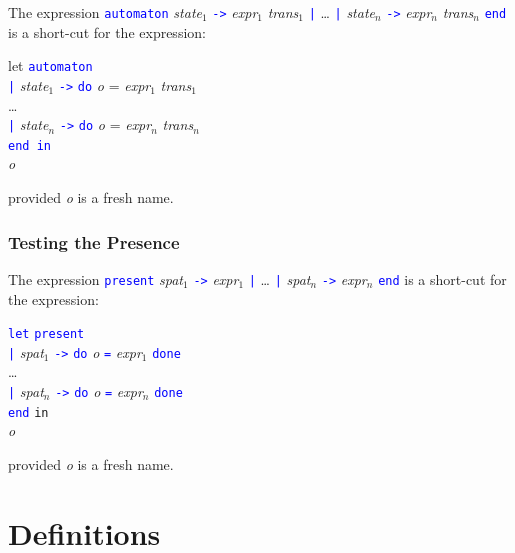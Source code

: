 \documentclass[11pt,titlepage,twoside]{report}
\newcommand{\In}{\mbox{{\tt in}}}
\newcommand{\Minusgreater}{\mbox{{\tt ->}}}
\newcommand{\term}[1]{\textcolor{Blue}{\tt #1}}
\newcommand{\nterm}[1]{\textcolor{BrickRed}{\it #1}}
\newcommand{\term}[1]{{\tt #1}}
\newcommand{\nterm}[1]{{\em #1}}
\begin{document}
The expression 
\term{automaton} \nterm{state}$_1$ \term{\Minusgreater} \nterm{expr}$_1$ 
                 \nterm{trans}$_1$ 
\term{|} \dots
\term{|} \nterm{state}$_n$ \term{\Minusgreater} \nterm{expr}$_n$ 
                 \nterm{trans}$_n$ \term{end} is a short-cut
for the expression:

\begin{tabbing}
let \= \term{automaton} \\
    \> \term{|} \nterm{state}$_1$ \term{\Minusgreater} 
                 \term{do} \nterm{o} = \nterm{expr}$_1$ \nterm{trans}$_1$ \\
    \> \dots \\
    \> \term{|} \nterm{state}$_n$ \term{\Minusgreater} 
              \term{do} \nterm{o} = \nterm{expr}$_n$ \nterm{trans}$_n$ \\
    \> \term{end in} \\
\nterm{o}
\end{tabbing}
provided \nterm{o} is a fresh name.

\subsubsection{Testing the Presence} %

The expression
\term{present}
  \nterm{spat}$_1$ \term{\Minusgreater} \nterm{expr}$_1$ \term{|} \dots 
\term{|} \nterm{spat}$_n$ \term{\Minusgreater} \nterm{expr}$_n$ \term{end}
is a short-cut for the expression:

\begin{center}
\begin{tabbing}
\term{let} \= \term{present} \\
           \> \term{|} \nterm{spat}$_1$ \term{\Minusgreater} 
               \term{do} \nterm{o} \term{=} \nterm{expr}$_1$ \term{done} \\
           \> \dots \\
           \> \term{|} \nterm{spat}$_n$ \term{\Minusgreater} 
               \term{do} \nterm{o} \term{=} \nterm{expr}$_n$ \term{done} \\
           \> \term{end} \In \\
\nterm{o}
\end{tabbing}
\end{center}
provided \nterm{o} is a fresh name.

\section{Definitions\label{langdefs}} %
\end{document}
